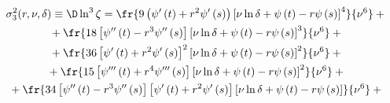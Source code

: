 \begin{multline*}


\sigma_3^2(r,\nu,\delta)\equiv \D \ln^3 \zeta= \fr{9\left(\psi'\left(t\right) + r^2\psi'\left(s\right) 


\right)\left[\nu\ln\delta + \psi\left(t\right) - r\psi\left(s \right) 


\right]^4}{\nu^6} +  {}\\


{} + \fr{18\left[\psi''\left(t\right)  - 


r^3\psi''\left(s\right)\right]\left[\nu\ln\delta + \psi\left(t\right) - 


r\psi\left(s \right) \right]^3}{\nu^6}  + {}\\


{}+ \fr{36\left[\psi'\left(t\right)+ 


r^2\psi'\left(s\right)\right]^2\left[\nu\ln\delta + \psi\left(t\right) - 


r\psi\left(s \right) \right]^2}{\nu^6} + {}\\


{} + \fr{15\left[\psi'''\left(t\right) + 


r^4\psi'''\left(s\right)\right]\left[\nu\ln\delta + \psi\left(t\right) - 


r\psi\left(s \right) \right]^2}{\nu^6} + {}\\


{} + \fr{34\left[\psi''\left(t\right)  - 


r^3\psi''\left(s\right)\right]\left[\psi'\left(t\right) + r^2\psi'\left(s\right) 


\right] \left[\nu\ln\delta + \psi\left(t\right) - r\psi\left(s \right) 


\right]}{\nu^6}+ {}


\end{multline*}








\noindent


